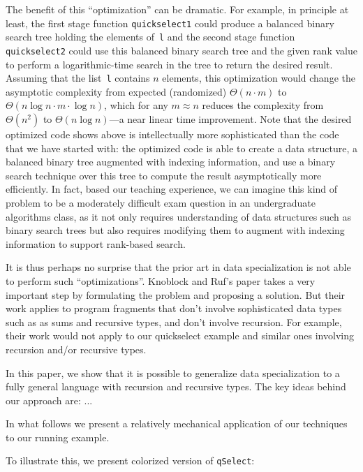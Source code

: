 The benefit of this ``optimization'' can be dramatic.  For example, in
principle at least, the first stage function \texttt{quickselect1}
could produce a balanced binary search tree holding the elements
of~\texttt{l} and the second stage function \texttt{quickselect2}
could use this balanced binary search tree and the given rank value to
perform a logarithmic-time search in the tree to return the desired
result.  Assuming that the list~\texttt{l} contains $n$ elements, this
optimization would change the asymptotic complexity from expected
(randomized) $\Theta(n \cdot m)$ to $\Theta(n\log{n} \cdot m
\cdot\log{n})$, which for any $m \approx n$ reduces the complexity
from $\Theta (n^2)$ to $\Theta(n\log{n})$---a near linear time
improvement.  Note that the desired optimized code shows above is
intellectually more sophisticated than the code that we have started
with: the optimized code is able to create a data structure, a
balanced binary tree augmented with indexing information, and use a
binary search technique over this tree to compute the result
asymptotically more efficiently.  In fact, based our teaching
experience, we can imagine this kind of problem to be a moderately
difficult exam question in an undergraduate algorithms class, as it
not only requires understanding of data structures such as binary
search trees but also requires modifying them to augment with indexing
information to support rank-based search.


It is thus perhaps no surprise that the prior art in data
specialization is not able to perform such ``optimizations''.
Knoblock and Ruf's paper takes a very important step by formulating
the problem and proposing a solution.  But their work applies to
program fragments that don't involve sophisticated data types such as
as sums and recursive types, and don't involve recursion. For example,
their work would not apply to our quickselect example and similar ones
involving recursion and/or  recursive types.

In this paper, we show that it is possible to generalize data
specialization to a fully general language with recursion and
recursive types.  The key ideas behind our approach are: ...


In what follows we present a relatively mechanical application of our
techniques to our running example. 




To illustrate this, we present colorized version of \texttt{qSelect}:


